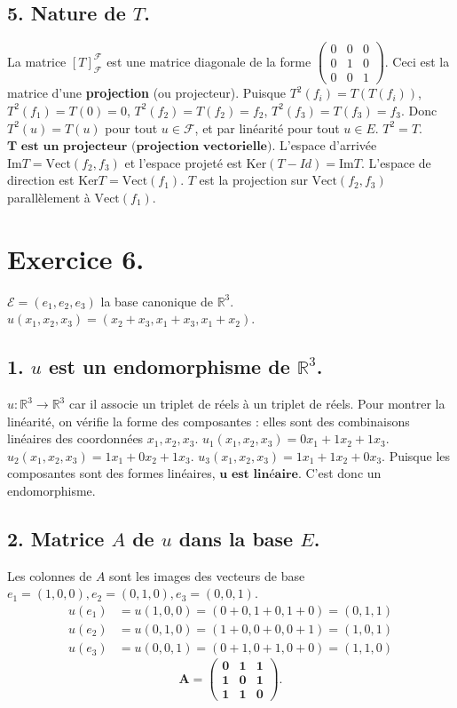 \documentclass[french]{yLectureNote}
\begin{document}
\subsection*{5. Nature de $T$.}
La matrice $[T]_{\mathcal{F}}^{\mathcal{F}}$ est une matrice diagonale de la forme $\begin{pmatrix} 0 & 0 & 0 \\ 0 & 1 & 0 \\ 0 & 0 & 1 \end{pmatrix}$.
Ceci est la matrice d'une \textbf{projection} (ou projecteur).
Puisque $T^2(f_i) = T(T(f_i))$, $T^2(f_1)=T(0)=0$, $T^2(f_2)=T(f_2)=f_2$, $T^2(f_3)=T(f_3)=f_3$.
Donc $T^2(u) = T(u)$ pour tout $u \in \mathcal{F}$, et par linéarité pour tout $u \in E$. $T^2 = T$.
$\mathbf{T \text{ est un projecteur (projection vectorielle).}}$
L'espace d'arrivée $\mathrm{Im}T = \mathrm{Vect}(f_2, f_3)$ et l'espace projeté est $\mathrm{Ker}(T-Id) = \mathrm{Im}T$.
L'espace de direction est $\mathrm{Ker}T = \mathrm{Vect}(f_1)$.
$T$ est la projection sur $\mathrm{Vect}(f_2, f_3)$ parallèlement à $\mathrm{Vect}(f_1)$.

\section*{Exercice 6.}
$\mathcal{E}=(e_{1},e_{2},e_{3})$ la base canonique de $\mathbb{R}^3$. $u(x_{1},x_{2},x_{3})=(x_{2}+x_{3},x_{1}+x_{3},x_{1}+x_{2})$.

\subsection*{1. $u$ est un endomorphisme de $\mathbb{R}^3$.}
$u: \mathbb{R}^3 \to \mathbb{R}^3$ car il associe un triplet de réels à un triplet de réels.
Pour montrer la linéarité, on vérifie la forme des composantes : elles sont des combinaisons linéaires des coordonnées $x_1, x_2, x_3$.
$u_1(x_1,x_2,x_3) = 0x_1 + 1x_2 + 1x_3$.
$u_2(x_1,x_2,x_3) = 1x_1 + 0x_2 + 1x_3$.
$u_3(x_1,x_2,x_3) = 1x_1 + 1x_2 + 0x_3$.
Puisque les composantes sont des formes linéaires, $\mathbf{u \text{ est linéaire}}$. C'est donc un endomorphisme.

\subsection*{2. Matrice $A$ de $u$ dans la base $E$.}
Les colonnes de $A$ sont les images des vecteurs de base $e_1=(1,0,0), e_2=(0,1,0), e_3=(0,0,1)$.
\begin{align*} u(e_1) &= u(1,0,0) = (0+0, 1+0, 1+0) = (0,1,1) \\ u(e_2) &= u(0,1,0) = (1+0, 0+0, 0+1) = (1,0,1) \\ u(e_3) &= u(0,0,1) = (0+1, 0+1, 0+0) = (1,1,0) \end{align*}
$$\mathbf{A = \begin{pmatrix} 0 & 1 & 1 \\ 1 & 0 & 1 \\ 1 & 1 & 0 \end{pmatrix}.}$$
\end{document}
